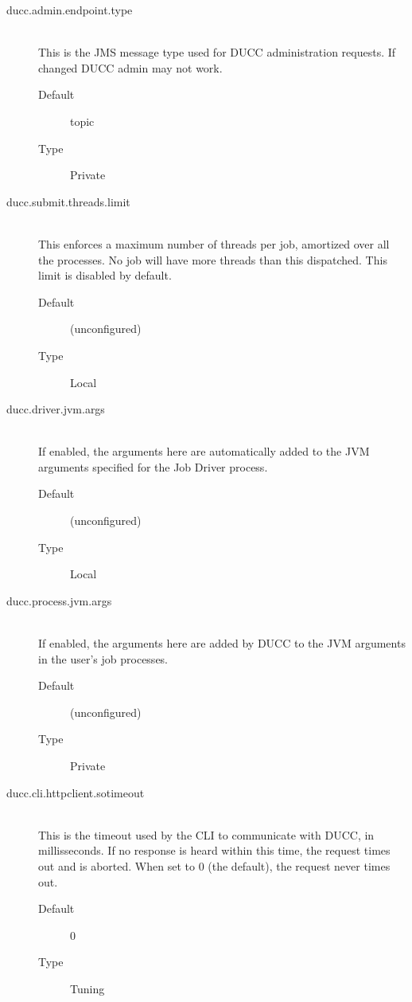 \begin{description}
       \item[ducc.admin.endpoint.type] \hfill \\
         This is the JMS message type used for DUCC administration requests. If changed DUCC 
         admin may not work. 
         \begin{description}
           \item[Default] topic 
           \item[Type] Private
         \end{description} 

       \item[ducc.submit.threads.limit] \hfill \\
         This enforces a maximum number of threads per job, amortized over all the processes. No 
         job will have more threads than this dispatched. This limit is disabled by default. 
         
         \begin{description}
           \item[Default] (unconfigured) 
           \item[Type] Local 
         \end{description}
                 

       \item[ducc.driver.jvm.args] \hfill \\
         If enabled, the arguments here are automatically added to the JVM arguments specified for 
         the Job Driver process. 
         \begin{description}
           \item[Default] (unconfigured) 
           \item[Type] Local 
         \end{description}

       \item[ducc.process.jvm.args] \hfill \\
         If enabled, the arguments here are added by DUCC to the JVM arguments in the user's job 
         processes. 
         \begin{description}
           \item[Default] (unconfigured) 
           \item[Type] Private 
         \end{description}
                   

       \item[ducc.cli.httpclient.sotimeout] \hfill \\
         This is the timeout used by the CLI to communicate with DUCC, in millisseconds. If no 
         response is heard within this time, the request times out and is aborted. When set to 0 (the 
         default), the request never times out. 
         \begin{description}
           \item[Default] 0 
           \item[Type] Tuning 
          \end{description}
                   

\end{description}

